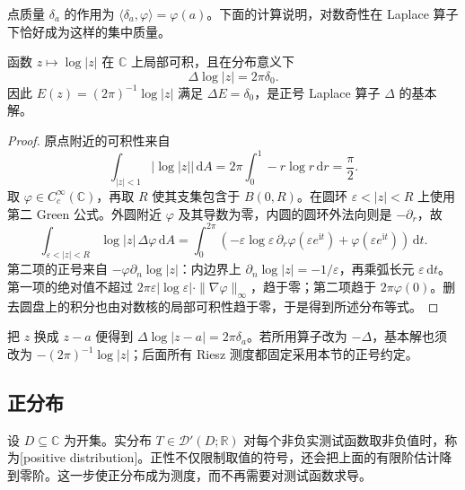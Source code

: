 \ProseParagraphBreak

点质量 \(\delta_a\) 的作用为 \(\langle\delta_a,\varphi\rangle=\varphi(a)\)。下面的计算说明，对数奇性在 Laplace 算子下恰好成为这样的集中质量。

\begin{proposition}[对数基本解]\label{b3:prop:15-log-fundamental}
函数 \(z\mapsto\log|z|\) 在 \(\mathbb C\) 上局部可积，且在分布意义下
\[
 \Delta\log|z|=2\pi\delta_0.
\]
因此 \(E(z)=(2\pi)^{-1}\log|z|\) 满足 \(\Delta E=\delta_0\)，是正号 Laplace 算子 \(\Delta\) 的基本解。
\end{proposition}
\begin{proof}
原点附近的可积性来自
\[
 \int_{|z|<1}|\log|z||\,\mathrm{d}A
 =2\pi\int_0^1-r\log r\,\mathrm{d}r=\frac\pi2.
\]
取 \(\varphi\in C_c^\infty(\mathbb C)\)，再取 \(R\) 使其支集包含于 \(B(0,R)\)。在圆环 \(\varepsilon<|z|<R\) 上使用第二 Green 公式。外圆附近 \(\varphi\) 及其导数为零，内圆的圆环外法向则是 \(-\partial_r\)，故
\[
 \int_{\varepsilon<|z|<R}\log|z|\,\Delta\varphi\,\mathrm{d}A
 =\int_0^{2\pi}
 \left(-\varepsilon\log\varepsilon\,
 \partial_r\varphi(\varepsilon e^{\mathrm{i}t})
 +\varphi(\varepsilon e^{\mathrm{i}t})\right)\,\mathrm{d}t.
\]
第二项的正号来自 \(-\varphi\partial_n\log|z|\)：内边界上 \(\partial_n\log|z|=-1/\varepsilon\)，再乘弧长元 \(\varepsilon\,\mathrm{d}t\)。第一项的绝对值不超过 \(2\pi\varepsilon|\log\varepsilon|\cdot\|\nabla\varphi\|_\infty\)，趋于零；第二项趋于 \(2\pi\varphi(0)\)。删去圆盘上的积分也由对数核的局部可积性趋于零，于是得到所述分布等式。
\end{proof}
把 \(z\) 换成 \(z-a\) 便得到 \(\Delta\log|z-a|=2\pi\delta_a\)。若所用算子改为 \(-\Delta\)，基本解也须改为 \(-(2\pi)^{-1}\log|z|\)；后面所有 Riesz 测度都固定采用本节的正号约定。

\subsection{正分布}
\label{b3:subsec:150402}

设 \(D\subseteq\mathbb C\) 为开集。实分布 \(T\in\mathcal D'(D;\mathbb R)\) 对每个非负实测试函数取非负值时，称为[positive distribution]。正性不仅限制取值的符号，还会把上面的有限阶估计降到零阶。这一步使正分布成为测度，而不再需要对测试函数求导。

